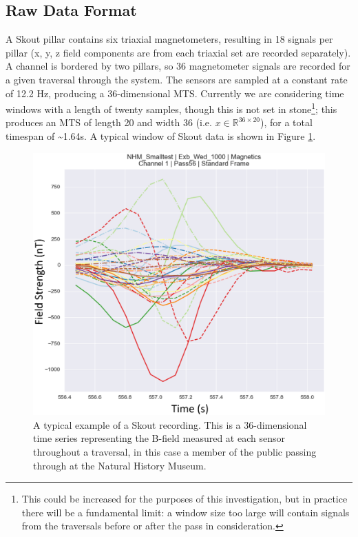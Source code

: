 \documentclass[10pt, a4paper, twocolumn]{article} %
\begin{document}

\subsection{Raw Data Format}

A Skout pillar contains six triaxial magnetometers, resulting in 18 signals per pillar (x, y, z field components are from each triaxial set are recorded separately). A channel is bordered by two pillars, so 36 magnetometer signals are recorded for a given traversal through the system. The sensors are sampled at a constant rate of 12.2 Hz, producing a 36-dimensional MTS. Currently we are considering time windows with a length of twenty samples, though this is not set in stone\footnote{This could be increased for the purposes of this investigation, but in practice there will be a fundamental limit: a window size too large will contain signals from the traversals before or after the pass in consideration.}; this produces an MTS of length 20 and width 36 (i.e. $x \in \mathbb{R}^{36\times20}$), for a total timespan of \textasciitilde1.64s. A typical window of Skout data is shown in Figure \ref{Skout_ref_data}.

\begin{figure}
	\includegraphics[width=\linewidth]{Figures/example_data.png} %
	\caption{A typical example of a Skout recording. This is a 36-dimensional time series representing the B-field measured at each sensor throughout a traversal, in this case a member of the public passing through at the Natural History Museum.}
	\label{Skout_ref_data}
\end{figure}
\end{document}
